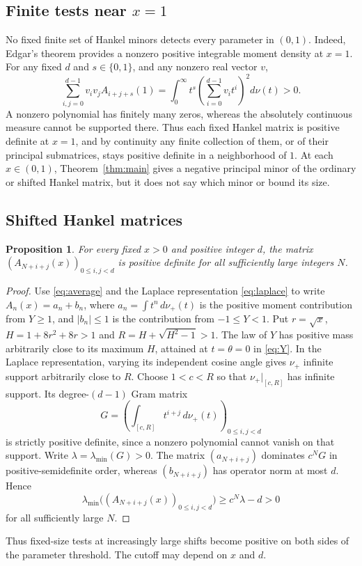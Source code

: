 \documentclass[11pt]{article}
\newtheorem{proposition}[theorem]{Proposition}
\begin{document}
\subsection{Finite tests near \texorpdfstring{$x=1$}{x=1}}
No fixed finite set of Hankel minors detects every parameter in
$(0,1)$. Indeed, Edgar's theorem \cite[Theorem 1]{Edgar} provides a nonzero
positive integrable moment density at $x=1$. For any fixed $d$ and
$s\in\{0,1\}$, and any nonzero real vector $v$,
\[
 \sum_{i,j=0}^{d-1}v_i v_j A_{i+j+s}(1)
 =\int_0^\infty t^s\left(\sum_{i=0}^{d-1}v_i t^i\right)^2d\nu(t)>0.
\]
A nonzero polynomial has finitely many zeros, whereas the absolutely
continuous measure cannot be supported there. Thus each fixed Hankel
matrix is positive definite at $x=1$, and by continuity any finite
collection of them, or of their principal submatrices, stays positive
definite in a neighborhood of $1$. At each $x\in(0,1)$,
Theorem~\ref{thm:main} gives a negative principal minor of the ordinary
or shifted Hankel matrix, but it does not say which minor or bound its
size.

\subsection{Shifted Hankel matrices}
\begin{proposition}\label{prop:shifts}
For every fixed $x>0$ and positive integer $d$, the matrix
$(A_{N+i+j}(x))_{0\le i,j<d}$ is positive definite for all sufficiently
large integers $N$.
\end{proposition}
\begin{proof}
Use \eqref{eq:average} and the Laplace representation \eqref{eq:laplace}
to write $A_n(x)=a_n+b_n$, where $a_n=\int t^n\,d\nu_+(t)$ is the
positive moment contribution from $Y\ge1$, and $|b_n|\le1$ is the
contribution from $-1\le Y<1$. Put $r=\sqrt{x}$,
$H=1+8r^2+8r>1$ and $R=H+\sqrt{H^2-1}>1$.
The law of $Y$ has positive mass arbitrarily close to its maximum $H$,
attained at $t=\theta=0$ in \eqref{eq:Y}. In the Laplace representation,
varying its independent cosine angle gives $\nu_+$ infinite support
arbitrarily close to $R$. Choose $1<c<R$ so that $\nu_+|_{[c,R]}$
has infinite support. Its degree-$(d-1)$ Gram matrix
\[
 G=\left(\int_{[c,R]}t^{i+j}\,d\nu_+(t)\right)_{0\le i,j<d}
\]
is strictly positive definite, since a nonzero polynomial cannot vanish
on that support. Write $\lambda=\lambda_{\min}(G)>0$.
The matrix $(a_{N+i+j})$ dominates $c^NG$ in positive-semidefinite order,
whereas $(b_{N+i+j})$ has operator norm at most $d$. Hence
\[
 \lambda_{\min}\bigl((A_{N+i+j}(x))_{0\le i,j<d}\bigr)
 \ge c^N\lambda-d>0
\]
for all sufficiently large $N$.
\end{proof}
Thus fixed-size tests at increasingly large shifts become positive on
both sides of the parameter threshold. The cutoff may depend on $x$ and $d$.
\end{document}
